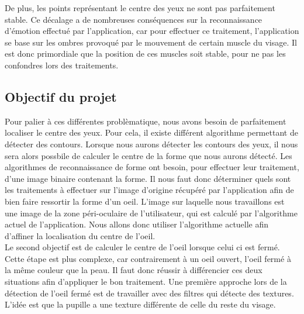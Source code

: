 De plus, les points représentant le centre des yeux ne sont pas parfaitement stable. Ce décalage a de 
nombreuses conséquences sur la reconnaissance d'émotion effectué par l'application, car pour effectuer
ce traitement, l'application se base sur les ombres provoqué par le mouvement de certain muscle du 
visage. Il est donc primordiale que la position de ces muscles soit stable, pour ne pas les confondres
lors des traitements.\\

\subsection{Objectif du projet}
Pour palier à ces différentes problèmatique, nous avons besoin de parfaitement localiser le centre des
yeux. Pour cela, il existe différent algorithme permettant de détecter des contours. Lorsque nous aurons
détecter les contours des yeux, il nous sera alors possbile de calculer le centre de la forme
que nous aurons détecté. Les algorithmes de reconnaissance de forme ont besoin, pour effectuer leur traitement,
d'une image binaire contenant la forme. Il nous faut donc déterminer quels sont les traitements à effectuer
sur l'image d'origine récupéré par l'application afin de bien faire ressortir la forme d'un oeil. L'image
sur laquelle nous travaillons est une image de la zone péri-oculaire de l'utilisateur, qui est calculé par
l'algorithme actuel de l'application. Nous allons donc utiliser l'algorithme actuelle afin d'affiner la localisation
du centre de l'oeil.\\

Le second objectif est de calculer le centre de l'oeil lorsque celui ci est fermé. Cette étape est plus complexe,
car contrairement à un oeil ouvert, l'oeil fermé à la même couleur que la peau. Il faut donc réussir à différencier ces
deux situations afin d'appliquer le bon traitement. Une première approche lors de la détection de l'oeil fermé est 
de travailler avec des filtres qui détecte des textures. L'idée est que la pupille a une texture différente de celle 
du reste du visage.


\newpage
